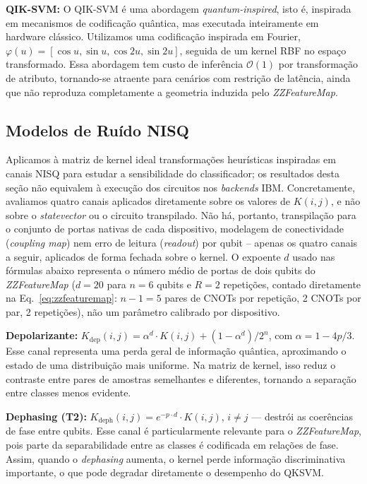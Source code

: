 \documentclass[12pt]{article}
\begin{document}
\textbf{QIK-SVM:} O QIK-SVM é uma abordagem \textit{quantum-inspired}, isto é, inspirada em mecanismos de codificação quântica, mas executada inteiramente em hardware clássico. Utilizamos uma codificação inspirada em Fourier, $\varphi(u) = [\cos u, \sin u, \cos 2u, \sin 2u]$, seguida de um kernel RBF no espaço transformado. Essa abordagem tem custo de inferência $\mathcal{O}(1)$ por transformação de atributo, tornando-se atraente para cenários com restrição de latência, ainda que não reproduza completamente a geometria induzida pelo \textit{ZZFeatureMap}.

\subsection{Modelos de Ruído NISQ}
\label{subsec:noise_models}

Aplicamos à matriz de kernel ideal transformações heurísticas inspiradas em canais NISQ para estudar a sensibilidade do classificador; os resultados desta seção não equivalem à execução dos circuitos nos \textit{backends} IBM. Concretamente, avaliamos quatro canais aplicados diretamente sobre os valores de $K(i,j)$, e não sobre o \textit{statevector} ou o circuito transpilado. Não há, portanto, transpilação para o conjunto de portas nativas de cada dispositivo, modelagem de conectividade (\textit{coupling map}) nem erro de leitura (\textit{readout}) por qubit -- apenas os quatro canais a seguir, aplicados de forma fechada sobre o kernel. O expoente $d$ usado nas fórmulas abaixo representa o número médio de portas de dois qubits do \textit{ZZFeatureMap} ($d=20$ para $n=6$ qubits e $R=2$ repetições, contado diretamente na Eq.~\ref{eq:zzfeaturemap}: $n{-}1=5$ pares de CNOTs por repetição, 2 CNOTs por par, 2 repetições), não um parâmetro calibrado por dispositivo.

\textbf{Depolarizante:} $K_\mathrm{dep}(i,j) = \alpha^d \cdot K(i,j) + (1-\alpha^d)/2^n$, com $\alpha = 1-4p/3$. Esse canal representa uma perda geral de informação quântica, aproximando o estado de uma distribuição mais uniforme. Na matriz de kernel, isso reduz o contraste entre pares de amostras semelhantes e diferentes, tornando a separação entre classes menos evidente.

\textbf{Dephasing (T2):} $K_\mathrm{deph}(i,j) = e^{-p\cdot d} \cdot K(i,j)$, $i \neq j$ — destrói as coerências de fase entre qubits. Esse canal é particularmente relevante para o \textit{ZZFeatureMap}, pois parte da separabilidade entre as classes é codificada em relações de fase. Assim, quando o \textit{dephasing} aumenta, o kernel perde informação discriminativa importante, o que pode degradar diretamente o desempenho do QKSVM.
\end{document}
